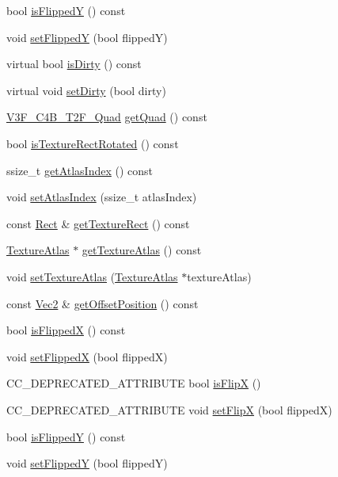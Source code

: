 \begin{Indent}
\begin{DoxyCompactItemize}
bool \hyperlink{classSprite_aed48b9f71be4e6c1d0bd2bbc8377ff17}{is\+FlippedY} () const
\item 
void \hyperlink{classSprite_ae0225a6dac4a1130bafff4619652b389}{set\+FlippedY} (bool flippedY)
\item 
virtual bool \hyperlink{classSprite_a206dfe184b32e6a9666b07246478a700}{is\+Dirty} () const
\item 
virtual void \hyperlink{classSprite_a7e621efdc4116feff17eba4ff93dcead}{set\+Dirty} (bool dirty)
\item 
\hyperlink{structV3F__C4B__T2F__Quad}{V3\+F\+\_\+\+C4\+B\+\_\+\+T2\+F\+\_\+\+Quad} \hyperlink{classSprite_abc0684e4913ae8aefb0f72c48c2514d1}{get\+Quad} () const
\item 
bool \hyperlink{classSprite_a917556f400941297e60a749c4dd01847}{is\+Texture\+Rect\+Rotated} () const
\item 
ssize\+\_\+t \hyperlink{classSprite_a6ba2e30af077e193e2aff281e89091a8}{get\+Atlas\+Index} () const
\item 
void \hyperlink{classSprite_aa3455e2c6a468008225d04e744d626f9}{set\+Atlas\+Index} (ssize\+\_\+t atlas\+Index)
\item 
const \hyperlink{classRect}{Rect} \& \hyperlink{classSprite_a6afd5a0d3f10b55eecebd4adab4004ba}{get\+Texture\+Rect} () const
\item 
\hyperlink{classTextureAtlas}{Texture\+Atlas} $\ast$ \hyperlink{classSprite_ab4ebd2216b9e419d81581b1072ce1254}{get\+Texture\+Atlas} () const
\item 
void \hyperlink{classSprite_a66f74cd6fa807964c5a9d06d6c927e38}{set\+Texture\+Atlas} (\hyperlink{classTextureAtlas}{Texture\+Atlas} $\ast$texture\+Atlas)
\item 
const \hyperlink{classVec2}{Vec2} \& \hyperlink{classSprite_a783cd2206e8da661869af7a49ad41d7c}{get\+Offset\+Position} () const
\item 
bool \hyperlink{classSprite_af16052422347fb5a609f69191e9503e6}{is\+FlippedX} () const
\item 
void \hyperlink{classSprite_ad18ebe3330284f096db0fc6e16839633}{set\+FlippedX} (bool flippedX)
\item 
C\+C\+\_\+\+D\+E\+P\+R\+E\+C\+A\+T\+E\+D\+\_\+\+A\+T\+T\+R\+I\+B\+U\+TE bool \hyperlink{classSprite_adec29867c0c49bb6f5642a377348da3d}{is\+FlipX} ()
\item 
C\+C\+\_\+\+D\+E\+P\+R\+E\+C\+A\+T\+E\+D\+\_\+\+A\+T\+T\+R\+I\+B\+U\+TE void \hyperlink{classSprite_ac10f5904c04e3cb5e6e982f88d1e9d04}{set\+FlipX} (bool flippedX)
\item 
bool \hyperlink{classSprite_aed48b9f71be4e6c1d0bd2bbc8377ff17}{is\+FlippedY} () const
\item 
void \hyperlink{classSprite_ae0225a6dac4a1130bafff4619652b389}{set\+FlippedY} (bool flippedY)
\end{DoxyCompactItemize}
\end{Indent}
